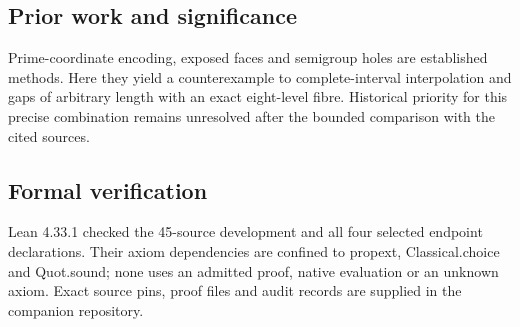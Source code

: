\documentclass[11pt,a4paper]{article}
\begin{document}
\subsection{Prior work and significance}
Prime-coordinate encoding, exposed faces and semigroup holes are established methods. Here they yield a counterexample to complete-interval interpolation and gaps of arbitrary length with an exact eight-level fibre. Historical priority for this precise combination remains unresolved after the bounded comparison with the cited sources.

\subsection{Formal verification}
Lean 4.33.1 checked the 45-source development and all four selected endpoint declarations. Their axiom dependencies are confined to propext, Classical.choice and Quot.sound; none uses an admitted proof, native evaluation or an unknown axiom. Exact source pins, proof files and audit records are supplied in the companion repository.
\end{document}
